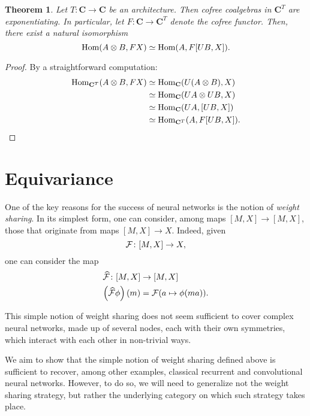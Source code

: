 \documentclass[12pt]{article}
\newtheorem{theorem}{Theorem}
\newcommand{\Hom}{{\textnormal{Hom}}}
\newcommand{\Cat}{{\mathbf{C}}}
\begin{document}
\begin{theorem}\label{thm:cofree_exponentiating}
    Let $T\colon \Cat \rightarrow \Cat$ be an architecture. Then cofree coalgebras in $\Cat^T$ are exponentiating. In particular, let $F\colon \Cat \rightarrow \Cat^T$ denote the cofree functor. Then, there exist a natural isomorphism
    \begin{equation*}
        \Hom(A\otimes B, FX) \simeq \Hom(A, F[UB, X]).
    \end{equation*}
\end{theorem}

\begin{proof}
    By a straightforward computation:
    \begin{align*}
        \Hom_{\Cat^T}(A\otimes B, FX)
        &\simeq \Hom_{\Cat}(U(A \otimes B), X)\\
        &\simeq \Hom_{\Cat}(UA \otimes UB, X)\\
        &\simeq \Hom_{\Cat}(UA, [UB, X])\\
        &\simeq \Hom_{\Cat^T}(A, F[UB, X]).
    \end{align*}
\end{proof}

\section{Equivariance}

One of the key reasons for the success of neural networks is the notion of {\em weight sharing}. In its simplest form, one can consider, among maps $[M, X] \rightarrow [M, X]$, those that originate from maps $[M, X] \rightarrow X$. Indeed, given
\begin{equation*}
    {\cal F} \colon [M, X] \rightarrow X,
\end{equation*}
one can consider the map
\begin{align*}
    \widehat{\cal F} \colon [M, X] &\rightarrow [M, X] \\
    \left(\widehat{\cal F}\phi\right)(m) &= {\cal F}(a \mapsto \phi(ma)).
\end{align*}

This simple notion of weight sharing does not seem sufficient to cover complex neural networks, made up of several nodes, each with their own symmetries, which interact with each other in non-trivial ways.

We aim to show that the simple notion of weight sharing defined above is sufficient to recover, among other examples, classical recurrent and convolutional neural networks. However, to do so, we will need to generalize not the weight sharing strategy, but rather the underlying category on which such strategy takes place.
\end{document}
